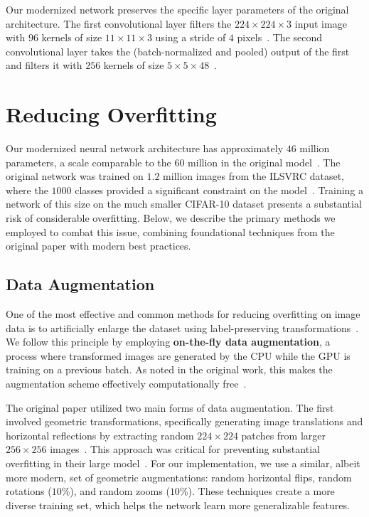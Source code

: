 \documentclass{article}
\begin{document}
Our modernized network preserves the specific layer parameters of the original architecture. The first convolutional layer filters the $224\times 224\times 3$ input image with $96$ kernels of size $11\times 11\times 3$ using a stride of $4$ pixels~\cite{krizhevsky2012imagenet}. The second convolutional layer takes the (batch-normalized and pooled) output of the first and filters it with $256$ kernels of size $5\times 5\times 48$~\cite{krizhevsky2012imagenet}.

\section{Reducing Overfitting}
\noindent
Our modernized neural network architecture has approximately $46$ million parameters, a scale comparable to the $60$ million in the original model~\cite{krizhevsky2012imagenet}. The original network was trained on $1.2$ million images from the ILSVRC dataset, where the $1000$ classes provided a significant constraint on the model~\cite{krizhevsky2012imagenet}. Training a network of this size on the much smaller CIFAR-10 dataset presents a substantial risk of considerable overfitting. Below, we describe the primary methods we employed to combat this issue, combining foundational techniques from the original paper with modern best practices.

\subsection{Data Augmentation}
\noindent
One of the most effective and common methods for reducing overfitting on image data is to artificially enlarge the dataset using label-preserving transformations~\cite{krizhevsky2012imagenet}. We follow this principle by employing \textbf{on-the-fly data augmentation}, a process where transformed images are generated by the CPU while the GPU is training on a previous batch. As noted in the original work, this makes the augmentation scheme effectively computationally free~\cite{krizhevsky2012imagenet}.

The original paper utilized two main forms of data augmentation. The first involved geometric transformations, specifically generating image translations and horizontal reflections by extracting random $224\times 224$ patches from larger $256\times 256$ images~\cite{krizhevsky2012imagenet}. This approach was critical for preventing substantial overfitting in their large model~\cite{krizhevsky2012imagenet}. For our implementation, we use a similar, albeit more modern, set of geometric augmentations: random horizontal flips, random rotations ($10\%$), and random zooms ($10\%$). These techniques create a more diverse training set, which helps the network learn more generalizable features.
\end{document}

